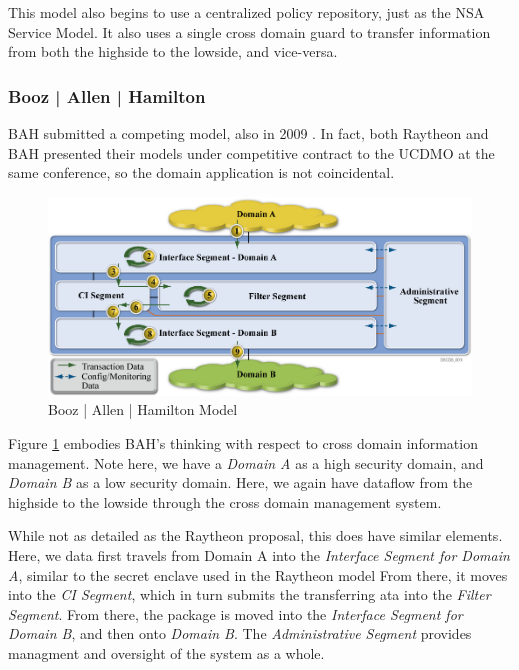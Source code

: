 \documentclass[12pt,letterpaper]{article}
\begin{document}
This model also begins to use a centralized policy repository, just as the NSA Service Model.  It also uses a single cross domain guard to transfer information from both the highside to the lowside, and vice-versa.

\subsubsection{Booz | Allen | Hamilton}
BAH submitted a competing model, also in 2009 \cite{proposal:bah-arch}.  In fact, both Raytheon and BAH presented their models under competitive contract to the UCDMO at the same conference, so the domain application is not coincidental.

\begin{figure}[!t]
\centering
\includegraphics[width=5in]{bah-arch}
\caption{Booz | Allen | Hamilton Model}
\label{fig:model:conceptual-model-bah}
\end{figure}

Figure \ref{fig:model:conceptual-model-bah} embodies BAH's thinking with respect to cross domain information management.  Note here, we have a \textit{Domain A} as a high security domain, and \textit{Domain B} as a low security domain.  Here, we again have dataflow from the highside to the lowside through the cross domain management system.

While not as detailed as the Raytheon proposal, this does have similar elements.  Here, we data first travels from Domain A into the \textit{Interface Segment for Domain A}, similar to the secret enclave used in the Raytheon model  From there, it moves into the \textit{CI Segment}, which in turn submits the transferring ata into the \textit{Filter Segment}.  From there, the package is moved into the \textit{Interface Segment for Domain B}, and then onto \textit{Domain B}.  The \textit{Administrative Segment} provides managment and oversight of the system as a whole.
\end{document}
